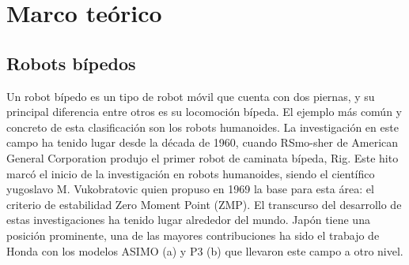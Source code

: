 \chapter{Marco teórico}\label{sec:marcoteorico}
\section{Robots bípedos}
Un robot bípedo es un tipo de robot móvil que cuenta con dos piernas, y su principal diferencia entre otros es su locomoción bípeda. \cite{yang2017stateart} El ejemplo más común y concreto de esta clasificación son los robots humanoides. La investigación en este campo ha tenido lugar desde la década de 1960, cuando RSmo-sher de American General Corporation produjo el primer robot de caminata bípeda, Rig. Este hito marcó el inicio de la investigación en robots humanoides, siendo el científico yugoslavo M. Vukobratovic quien propuso en 1969 la base para esta área: el criterio de estabilidad Zero Moment Point (ZMP).\cite{chen2013walking}
El transcurso del desarrollo de estas investigaciones ha tenido lugar alrededor del mundo. Japón tiene una posición prominente, una de las mayores contribuciones ha sido el trabajo de Honda con los modelos ASIMO (a) y P3 (b) que llevaron este campo a otro nivel.\cite{chen2013walking}
